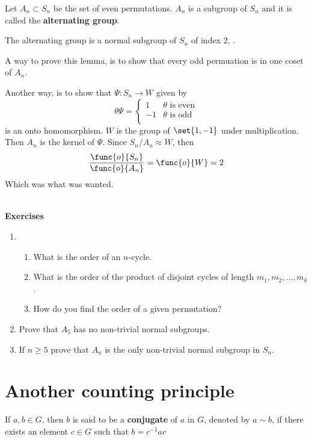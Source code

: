 Let \(A_n \subset S_n\) be the set of even permutations. \(A_n\) is a subgroup of \(S_n\) and it is called the \textbf{alternating group}. 
\begin{lemma}
    The alternating group is a normal subgroup of \(S_n\) of index \(2\), .
\end{lemma}
\begin{prooflemma}
    A way to prove this lemma, is to show that every odd permuation is in one coset of \(A_n\).
    
    Another way, is to show that \(\Psi:S_n \to W\) given by 
    \begin{equation*}
        \theta \Psi = \begin{cases}
            1 & \theta \text{ is even}\\
            -1 & \theta \text{ is odd}\\
        \end{cases}
    \end{equation*}
    is an onto homomorphism. \(W\) is the group of \(\set{1,-1}\) under multiplication. Then \(A_n\) is the kernel of \(\Psi\). Since \(S_n/A_n \approx W\), then 
    \begin{equation*}
        \dfrac{\func{o}{S_n}}{\func{o}{A_n}} = \func{o}{W} = 2
    \end{equation*}
    Which was what was wanted.
\end{prooflemma}
\ \\ 
{\Large{\textbf{Exercises}}}
\begin{enumerate}
    \item  
    \begin{enumerate}
        \item What is the order of an \(n\)-cycle.
        \item What is the order of the product of disjoint cycles of length \(m_1,m_2, \dots , m_k\).
        \item How do you find the order of a given permutation?
    \end{enumerate}
    \item Prove that \(A_5\) has no non-trivial normal subgroups.
    \item If \(n \geq 5\) prove that \(A_n\) is the only non-trivial normal subgroup in \(S_n\).
\end{enumerate}
\section{Another counting principle} 
\begin{definition}
    If \(a,b \in G\), then \(b\) is said to be a \textbf{conjugate} of \(a\) in \(G\), denoted by \(a \sim b\), if there exists an element \(c \in G\) such that \(b = c^{-1}ac\)
\end{definition}

